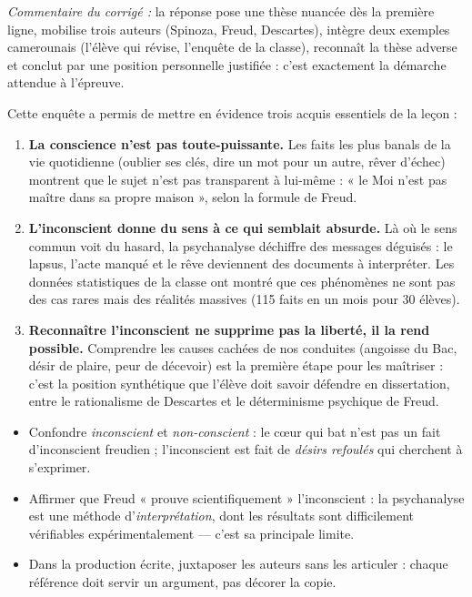 \documentclass[11pt]{article}
\newcounter{popsec}
\newcounter{popsub}
\newcommand{\courssub}[1]{%
  \stepcounter{popsub}%
  \par\vspace{9pt}\noindent{\popxbold\fontsize{11.5}{13}\selectfont\color{popink}{\color{poporange}\thepopsec.\thepopsub}\hspace{6pt}#1}\par\nopagebreak\vspace{4pt}
}
\begin{document}
\begin{exoresolu}
\emph{Commentaire du corrigé :} la réponse pose une thèse nuancée dès la première ligne, mobilise trois auteurs (Spinoza, Freud, Descartes), intègre deux exemples camerounais (l'élève qui révise, l'enquête de la classe), reconnaît la thèse adverse et conclut par une position personnelle justifiée : c'est exactement la démarche attendue à l'épreuve.
\end{exoresolu}

\courssub{Bilan de l'activité}

Cette enquête a permis de mettre en évidence trois acquis essentiels de la leçon :

\begin{enumerate}
\item \textbf{La conscience n'est pas toute-puissante.} Les faits les plus banals de la vie quotidienne (oublier ses clés, dire un mot pour un autre, rêver d'échec) montrent que le sujet n'est pas transparent à lui-même : « le Moi n'est pas maître dans sa propre maison », selon la formule de Freud.
\item \textbf{L'inconscient donne du sens à ce qui semblait absurde.} Là où le sens commun voit du hasard, la psychanalyse déchiffre des messages déguisés : le lapsus, l'acte manqué et le rêve deviennent des documents à interpréter. Les données statistiques de la classe ont montré que ces phénomènes ne sont pas des cas rares mais des réalités massives (115 faits en un mois pour 30 élèves).
\item \textbf{Reconnaître l'inconscient ne supprime pas la liberté, il la rend possible.} Comprendre les causes cachées de nos conduites (angoisse du Bac, désir de plaire, peur de décevoir) est la première étape pour les maîtriser : c'est la position synthétique que l'élève doit savoir défendre en dissertation, entre le rationalisme de Descartes et le déterminisme psychique de Freud.
\end{enumerate}

\begin{attention}
\begin{itemize}
\item Confondre \emph{inconscient} et \emph{non-conscient} : le cœur qui bat n'est pas un fait d'inconscient freudien ; l'inconscient est fait de \emph{désirs refoulés} qui cherchent à s'exprimer.
\item Affirmer que Freud « prouve scientifiquement » l'inconscient : la psychanalyse est une méthode d'\emph{interprétation}, dont les résultats sont difficilement vérifiables expérimentalement — c'est sa principale limite.
\item Dans la production écrite, juxtaposer les auteurs sans les articuler : chaque référence doit servir un argument, pas décorer la copie.
\end{itemize}
\end{attention}
\end{document}
